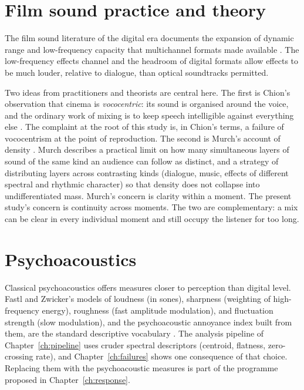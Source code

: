 \section{Film sound practice and theory}

The film sound literature of the digital era documents the expansion of dynamic range and low-frequency capacity that multichannel formats made available \citep{sergi2004,kerins2011}. The low-frequency effects channel and the headroom of digital formats allow effects to be much louder, relative to dialogue, than optical soundtracks permitted.

Two ideas from practitioners and theorists are central here. The first is Chion's observation that cinema is \emph{vococentric}: its sound is organised around the voice, and the ordinary work of mixing is to keep speech intelligible against everything else \citep{chion1994}. The complaint at the root of this study is, in Chion's terms, a failure of vococentrism at the point of reproduction. The second is Murch's account of density \citep{murch2005}. Murch describes a practical limit on how many simultaneous layers of sound of the same kind an audience can follow as distinct, and a strategy of distributing layers across contrasting kinds (dialogue, music, effects of different spectral and rhythmic character) so that density does not collapse into undifferentiated mass. Murch's concern is clarity within a moment. The present study's concern is continuity across moments. The two are complementary: a mix can be clear in every individual moment and still occupy the listener for too long.

\section{Psychoacoustics}

Classical psychoacoustics offers measures closer to perception than digital level. Fastl and Zwicker's models of loudness (in sones), sharpness (weighting of high-frequency energy), roughness (fast amplitude modulation), and fluctuation strength (slow modulation), and the psychoacoustic annoyance index built from them, are the standard descriptive vocabulary \citep{fastl2007}. The analysis pipeline of Chapter~\ref{ch:pipeline} uses cruder spectral descriptors (centroid, flatness, zero-crossing rate), and Chapter~\ref{ch:failures} shows one consequence of that choice. Replacing them with the psychoacoustic measures is part of the programme proposed in Chapter~\ref{ch:response}.

